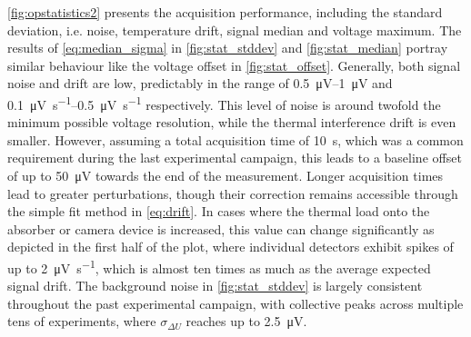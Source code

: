             \autoref{fig:opstatistics2} presents the acquisition performance, including the standard deviation, i.e. noise, temperature drift, signal median and voltage maximum. The results of \cref{eq:median_sigma} in \cref{fig:stat_stddev} and \cref{fig:stat_median} portray similar behaviour like the voltage offset in \cref{fig:stat_offset}. Generally, both signal noise and drift are low, predictably in the range of \SIrange{0.5}{1}{\micro\volt} and \SIrange{0.1}{0.5}{\micro\volt\per\second} respectively. This level of noise is around twofold the minimum possible voltage resolution, while the thermal interference drift is even smaller. However, assuming a total acquisition time of \SI{10}{\second}, which was a common requirement during the last experimental campaign, this leads to a baseline offset of up to \SI{50}{\micro\volt} towards the end of the measurement. Longer acquisition times lead to greater perturbations, though their correction remains accessible through the simple fit method in \cref{eq:drift}. In cases where the thermal load onto the absorber or camera device is increased, this value can change significantly as depicted in the first half of the plot, where individual detectors exhibit spikes of up to \SI{2}{\micro\volt\per\second}, which is almost ten times as much as the average expected signal drift. The background noise in \cref{fig:stat_stddev} is largely consistent throughout the past experimental campaign, with collective peaks across multiple tens of experiments, where $\sigma_{\Delta U}$ reaches up to \SI{2.5}{\micro\volt}. %
%
